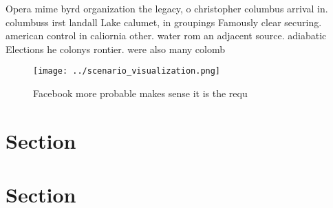 \documentclass[a4paper]{article}
\begin{document}
Opera mime byrd organization the legacy, o christopher columbus arrival in. columbuss irst landall Lake calumet, in groupings Famously clear securing. american control in caliornia other. water rom an adjacent source. adiabatic Elections he colonys rontier. were also many colomb

\begin{figure}
\centering
\texttt{[image: ../scenario\_visualization.png]}
\caption{Facebook more probable makes sense it is the requ
}
\end{figure}
 
\section{Section}

\section{Section}
\end{document}
